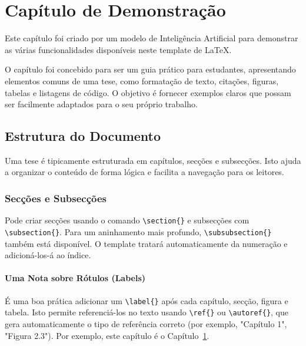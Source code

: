\chapter{Capítulo de Demonstração}
\label{chap:demonstration}

\begin{introduction}
Este capítulo foi criado por um modelo de Inteligência Artificial para demonstrar as várias funcionalidades disponíveis neste template de \LaTeX{}. 
\end{introduction}

O capítulo foi concebido para ser um guia prático para estudantes, apresentando elementos comuns de uma tese, como formatação de texto, citações, figuras, tabelas e listagens de código. O objetivo é fornecer exemplos claros que possam ser facilmente adaptados para o seu próprio trabalho.

\section{Estrutura do Documento}
Uma tese é tipicamente estruturada em capítulos, secções e subsecções. Isto ajuda a organizar o conteúdo de forma lógica e facilita a navegação para os leitores.

\subsection{Secções e Subsecções}
Pode criar secções usando o comando \verb|\section{}| e subsecções com \verb|\subsection{}|. Para um aninhamento mais profundo, \verb|\subsubsection{}| também está disponível. O template tratará automaticamente da numeração e adicioná-los-á ao índice.

\subsubsection{Uma Nota sobre Rótulos (Labels)}
É uma boa prática adicionar um \verb|\label{}| após cada capítulo, secção, figura e tabela. Isto permite referenciá-los no texto usando \verb|\ref{}| ou \verb|\autoref{}|, que gera automaticamente o tipo de referência correto (por exemplo, "Capítulo 1", "Figura 2.3"). Por exemplo, este capítulo é o Capítulo~\ref{chap:demonstration}.


